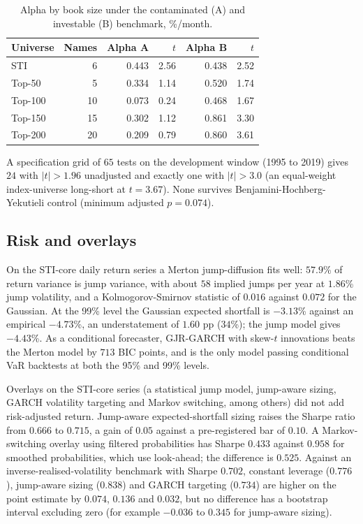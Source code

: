 \documentclass[11pt,a4paper]{article}
\begin{document}
\begin{table}[h]
\centering
\caption{Alpha by book size under the contaminated (A) and investable (B) benchmark, \%/month.}
\label{tab:bench}
\begin{tabular}{lrrrrr}
\toprule
Universe & Names & Alpha A & $t$ & Alpha B & $t$ \\
\midrule
STI & 6 & 0.443 & 2.56 & 0.438 & 2.52 \\
Top-50 & 5 & 0.334 & 1.14 & 0.520 & 1.74 \\
Top-100 & 10 & 0.073 & 0.24 & 0.468 & 1.67 \\
Top-150 & 15 & 0.302 & 1.12 & 0.861 & 3.30 \\
Top-200 & 20 & 0.209 & 0.79 & 0.860 & 3.61 \\
\bottomrule
\end{tabular}
\end{table}

A specification grid of $65$ tests on the development window (1995 to 2019) gives $24$ with $|t|>1.96$ unadjusted and exactly one with $|t|>3.0$ (an equal-weight index-universe long-short at $t=3.67$). None survives Benjamini-Hochberg-Yekutieli control (minimum adjusted $p=0.074$).

\subsection{Risk and overlays}
On the STI-core daily return series a Merton jump-diffusion fits well: $57.9$\% of return variance is jump variance, with about $58$ implied jumps per year at $1.86$\% jump volatility, and a Kolmogorov-Smirnov statistic of $0.016$ against $0.072$ for the Gaussian. At the 99\% level the Gaussian expected shortfall is $-3.13$\% against an empirical $-4.73$\%, an understatement of $1.60$ pp ($34$\%); the jump model gives $-4.43$\%. As a conditional forecaster, GJR-GARCH with skew-$t$ innovations beats the Merton model by $713$ BIC points, and is the only model passing conditional VaR backtests at both the 95\% and 99\% levels.

Overlays on the STI-core series (a statistical jump model, jump-aware sizing, GARCH volatility targeting and Markov switching, among others) did not add risk-adjusted return. Jump-aware expected-shortfall sizing raises the Sharpe ratio from $0.666$ to $0.715$, a gain of $0.05$ against a pre-registered bar of $0.10$. A Markov-switching overlay using filtered probabilities has Sharpe $0.433$ against $0.958$ for smoothed probabilities, which use look-ahead; the difference is $0.525$. Against an inverse-realised-volatility benchmark with Sharpe $0.702$, constant leverage ($0.776$), jump-aware sizing ($0.838$) and GARCH targeting ($0.734$) are higher on the point estimate by $0.074$, $0.136$ and $0.032$, but no difference has a bootstrap interval excluding zero (for example $-0.036$ to $0.345$ for jump-aware sizing).
\end{document}
